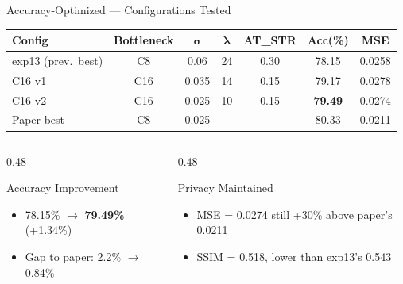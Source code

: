 \documentclass[aspectratio=169, 10pt]{beamer}
\newcommand{\good}[1]{\textcolor{goodgreen}{#1}}
\begin{document}
\begin{frame}{Accuracy-Optimized --- Configurations Tested}

\begin{center}
\renewcommand{\arraystretch}{1.2}
\small
\begin{tabular}{l c c c c c c}
\toprule
\textbf{Config} & \textbf{Bottleneck} & $\boldsymbol{\sigma}$ & $\boldsymbol{\lambda}$ & \textbf{AT\_STR} & \textbf{Acc(\%)} & \textbf{MSE} \\
\midrule
exp13 (prev.\ best) & C8 & 0.06 & 24 & 0.30 & 78.15 & 0.0258 \\
\hdashline
C16 v1 & \good{C16} & 0.035 & 14 & 0.15 & 79.17 & 0.0278 \\
\rowcolor{green!10}
C16 v2 & \good{C16} & 0.025 & 10 & 0.15 & \textbf{79.49} & 0.0274 \\
\midrule
Paper best & C8 & 0.025 & --- & --- & 80.33 & 0.0211 \\
\bottomrule
\end{tabular}
\end{center}

\vspace{0.2cm}

\begin{columns}[T]
\begin{column}{0.48\textwidth}
\begin{block}{\small Accuracy Improvement}
\begin{itemize}\small
    \item 78.15\% $\to$ \good{\textbf{79.49\%}} (+1.34\%)
    \item Gap to paper: 2.2\% $\to$ \good{0.84\%}
\end{itemize}
\end{block}
\end{column}
\begin{column}{0.48\textwidth}
\begin{block}{\small Privacy Maintained}
\begin{itemize}\small
    \item MSE = 0.0274 still \good{+30\%} above paper's 0.0211
    \item SSIM = 0.518, lower than exp13's 0.543
\end{itemize}
\end{block}
\end{column}
\end{columns}

\end{frame}
\end{document}
